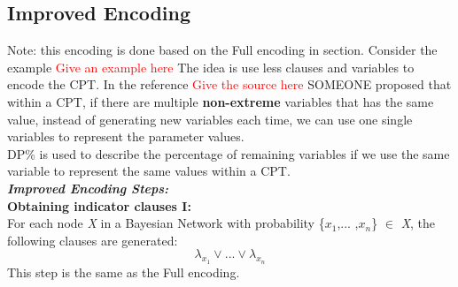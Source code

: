 \subsection{Improved Encoding}
Note: this encoding is done based on the Full encoding in section. Consider the example \textcolor{red}{Give an example here}
The idea is use less clauses and variables to encode the CPT. 
In the reference \textcolor{red}{Give the source here} SOMEONE proposed that within a CPT, if there are multiple \textbf{non-extreme} variables that has the same value, instead of generating new variables each time, we can use one single variables to represent the parameter values.\\
DP\% is used to describe the
percentage of remaining variables if we use the same variable to represent the same values within a CPT.\\
\textbf{\textit{Improved Encoding Steps:}}\\
\textbf{Obtaining indicator clauses \textsc{I}:}\\
For each node \textit{X} in a Bayesian Network with probability \{$x_{1}$,... ,$x_{n}$\} $\in$ \textit{X}, the following clauses are generated:
\begin{equation}\label{Improvedenc_ic}
    \lambda_{x_{1}} \vee ... \vee \lambda_{x_{n}}
\end{equation}
This step is the same as the Full encoding.\\

